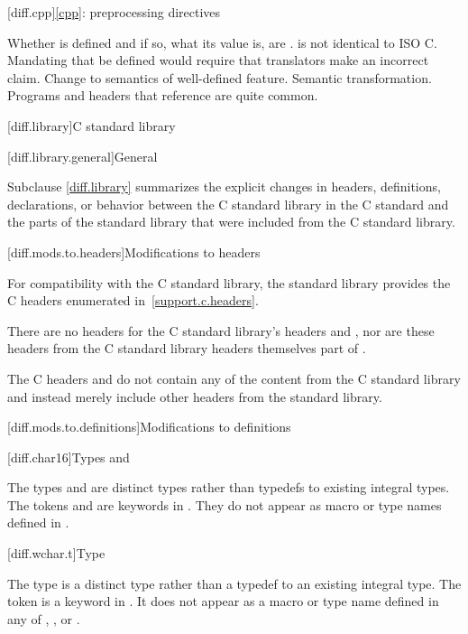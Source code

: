[diff.cpp]{\ref{cpp}: preprocessing directives}

\change
Whether  is defined and if so, what its value is, are
.
\rationale
\Cpp{} is not identical to ISO C\@.
Mandating that 
be defined would require that translators make an incorrect claim.
\effect
Change to semantics of well-defined feature.
\difficulty
Semantic transformation.
\howwide
Programs and headers that reference  are
quite common.

[diff.library]{C standard library}

[diff.library.general]{General}
%

\pnum
Subclause \ref{diff.library} summarizes the explicit changes in headers,
definitions, declarations, or behavior between the C standard library
in the C standard and the parts of the \Cpp{} standard library that were
included from the C standard library.

[diff.mods.to.headers]{Modifications to headers}

\pnum
For compatibility with the C standard library,
the \Cpp{} standard library provides the C headers enumerated
in~\ref{support.c.headers}.

\pnum
There are no \Cpp{} headers for the C standard library's headers
 and ,
nor are these headers from the C standard library headers themselves part of \Cpp{}.

\pnum
The C headers  and
 do not contain any of the content from
the C standard library and instead merely include other headers from the \Cpp{}
standard library.

[diff.mods.to.definitions]{Modifications to definitions}

[diff.char16]{Types  and }

\pnum
The types  and 
are distinct types rather than typedefs to existing integral types.
The tokens  and 
are keywords in \Cpp{}.
They do not appear as macro or type names defined in
.

[diff.wchar.t]{Type }

\pnum
The type  is a distinct type rather than a typedef to an
existing integral type.
The token 
is a keyword in \Cpp{}.
It does not appear as a macro or type name defined in any of
,
,
or .

